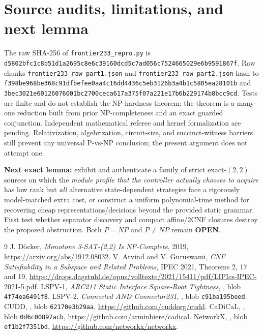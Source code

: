 \documentclass[10pt]{article}
\begin{document}
\section{Source audits, limitations, and next lemma}
The raw SHA-256 of \texttt{frontier233\_repro.py} is \texttt{d5802bfc1c8b51d1a2695c8e6c39160dcd5c7ad056c7524665029e6b9591867f}. Raw chunks \texttt{frontier233\_raw\_part1.json} and \texttt{frontier233\_raw\_part2.json} hash to \texttt{f398be968be368c91dfbefee0aa4c16dd4436c5eb3126b3a4b1c5805ea28101b} and \texttt{3bec3021e60126076001bc2700ceca617a375f07a221e17b6b229174b8bcc9cd}. Tests are finite and do not establish the NP-hardness theorem; the theorem is a many-one reduction built from prior NP-completeness and an exact guarded conjunction. Independent mathematical referee and kernel formalization are pending. Relativization, algebrization, circuit-size, and succinct-witness barriers still prevent any universal P-vs-NP conclusion; the present argument does not attempt one.

\noindent \textbf{Next exact lemma:} exhibit and authenticate a family of strict exact-$(2,2)$ sources on which the \emph{module profile that the controller actually chooses to acquire} has low rank but \emph{all} alternative state-dependent strategies face a rigorously model-matched extra cost, or construct a uniform polynomial-time method for recovering cheap representations/decisions beyond the provided static grammar. First test whether separator discovery and compact affine/2CNF closures destroy the proposed obstruction. Both $P=NP$ and $P\ne NP$ remain \textbf{OPEN}.

\begin{thebibliography}{9}
 J. D\"ocker, \emph{Monotone 3-SAT-(2,2) Is NP-Complete}, 2019, \url{https://arxiv.org/abs/1912.08032}.
 V. Arvind and V. Guruswami, \emph{CNF Satisfiability in a Subspace and Related Problems}, IPEC 2021, Theorems 2, 17 and 19, \url{https://drops.dagstuhl.de/opus/volltexte/2021/15411/pdf/LIPIcs-IPEC-2021-5.pdf}.
 LSPV-1, \emph{ARC211 Static Interface Square-Root Tightness}, , blob \texttt{4f74ea6491f8}.
 LSPV-2, \emph{Connected AND Connector231}, , blob \texttt{c91ba195beed}.
 CUDD, , blob \texttt{62170e3b29aa}, \url{https://github.com/cuddorg/cudd}.
 CaDiCaL, , blob \texttt{0d6c00897acb}, \url{https://github.com/arminbiere/cadical}.
 NetworkX, , blob \texttt{ef1b2f7351bd}, \url{https://github.com/networkx/networkx}.
\end{thebibliography}
\end{document}
